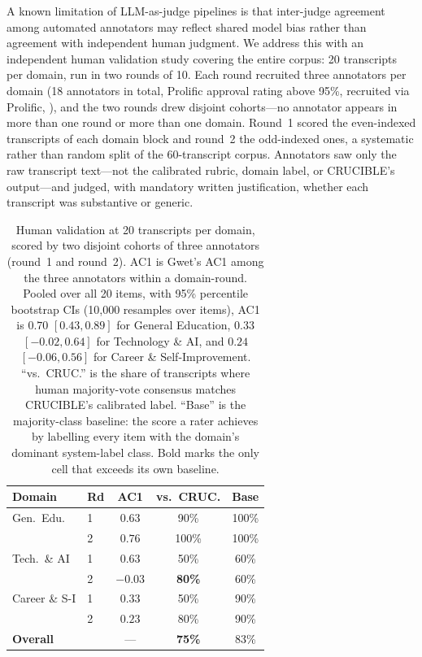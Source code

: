 \documentclass[letterpaper]{article}
\begin{document}
A known limitation of LLM-as-judge pipelines is that inter-judge agreement
among automated annotators may reflect shared model bias rather than
agreement with independent human judgment. We address this with an
independent human validation study covering the entire corpus: 20 transcripts
per domain, run in two rounds of 10. Each round recruited three annotators per
domain (18 annotators in total, Prolific approval rating above 95\%, recruited
via Prolific, \citealp{palan2018prolific}), and the two rounds drew disjoint
cohorts---no annotator appears in more than one round or more than one domain.
Round~1 scored the even-indexed transcripts of each domain block and round~2
the odd-indexed ones, a systematic rather than random split of the
60-transcript corpus. Annotators saw only the raw transcript
text---not the calibrated rubric, domain label, or CRUCIBLE's output---and
judged, with mandatory written justification, whether each transcript was
substantive or generic.

\begin{table}[tb]
\centering
{\footnotesize
\setlength{\tabcolsep}{3.5pt}
\begin{tabular}{@{}llccc@{}}
\toprule
\textbf{Domain} & \textbf{Rd} & \textbf{AC1} & \textbf{vs.\ CRUC.} &
\textbf{Base} \\
\midrule
Gen.\ Edu.      & 1 & $0.63$    & 90\%           & 100\% \\
                & 2 & $0.76$    & 100\%          & 100\% \\
Tech.\ \& AI    & 1 & $0.63$    & 50\%           & 60\%  \\
                & 2 & $-0.03$   & \textbf{80\%}  & 60\%  \\
Career \& S-I   & 1 & $0.33$    & 50\%           & 90\%  \\
                & 2 & $0.23$    & 80\%           & 90\%  \\
\midrule
\textbf{Overall} & & ---        & \textbf{75\%}  & 83\%  \\
\bottomrule
\end{tabular}}
\caption{Human validation at 20 transcripts per domain, scored by two disjoint
cohorts of three annotators (round~1 and round~2). AC1 is Gwet's AC1 among the three annotators
within a domain-round. Pooled over all 20 items, with 95\% percentile
bootstrap CIs (10{,}000 resamples over items), AC1 is $0.70$
$[0.43, 0.89]$ for General Education, $0.33$ $[-0.02, 0.64]$ for
Technology \& AI, and $0.24$ $[-0.06, 0.56]$ for Career \&
Self-Improvement.
``vs.\ CRUC.'' is the share of transcripts where human majority-vote consensus
matches CRUCIBLE's calibrated label. ``Base'' is the majority-class baseline:
the score a rater achieves by labelling every item with the domain's dominant
system-label class. Bold marks the only cell that exceeds its own baseline.}
\label{tab:humanval}
\end{table}
\end{document}
